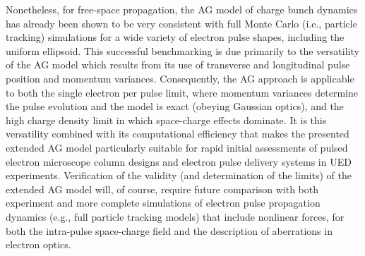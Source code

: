 Nonetheless, for free-space propagation, the AG model of charge bunch dynamics has already been shown to be very consistent with full Monte Carlo (i.e., particle tracking) simulations for a wide variety of electron pulse shapes,\cite{michalik_analytic_2006,michalik_evolution_2009} including the uniform ellipsoid.\cite{luiten_how_2004}
This successful benchmarking is due primarily to the versatility of the AG model which results from its use of transverse and longitudinal pulse position and momentum variances.
Consequently, the AG approach is applicable to both the single electron per pulse limit,\cite{lobastov_four-dimensional_2005} where momentum variances determine the pulse evolution and the model is exact (obeying Gaussian optics), and the high charge density limit in which space-charge effects dominate.\cite{luiten_how_2004,siwick_ultrafast_2002,cao_femtosecond_2003}
It is this versatility combined with its computational efficiency that makes the presented extended AG model particularly suitable for rapid initial assessments of pulsed electron microscope column designs and electron pulse delivery systems in UED experiments.
Verification of the validity (and determination of the limits) of the extended AG model will, of course, require future comparison with both experiment and more complete simulations of electron pulse propagation dynamics (e.g., full particle tracking models) that include nonlinear forces, for both the intra-pulse space-charge field and the description of aberrations in electron optics.

